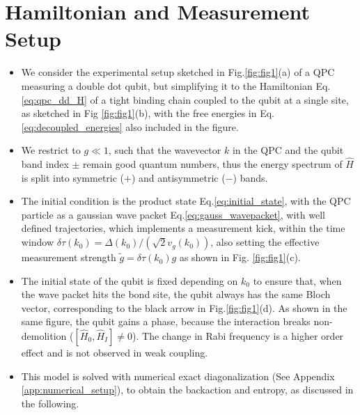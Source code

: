 \documentclass[10pt,
 amsmath,amssymb,
 aps,prb, twocolumn
]{revtex4-2}
\begin{document}
\section{Hamiltonian and Measurement Setup}\label{sect:model}
\begin{itemize}
   \item  We consider the experimental setup sketched in Fig.\ref{fig:fig1}(a) of a QPC measuring a double dot qubit, but simplifying it to the Hamiltonian Eq.\eqref{eq:qpc_dd_H} of a tight binding chain coupled to the qubit at a single site, as sketched in Fig \ref{fig:fig1}(b), with the free energies in Eq.\eqref{eq:decoupled_energies} also included in the figure. 

   \item We restrict to $g\ll 1$, such that the wavevector $k$ in the QPC and the qubit band index $\pm$ remain good quantum numbers, thus the energy spectrum of $\hat{H}$ is split into symmetric ($+$) and antisymmetric ($-$) bands.
   
   \item The initial condition is the product state Eq.\eqref{eq:initial_state}, with the QPC particle as a gaussian wave packet Eq.\eqref{eq:gauss_wavepacket}, with well defined trajectories, which implements a measurement kick, within the time window $\delta \tau(k_0) = \Delta(k_0)/(\sqrt{2}v_g(k_0)) $, also setting the effective measurement strength $\tilde{g} = \delta \tau(k_0) g$ as shown in Fig. \ref{fig:fig1}(c).

    \item The initial state of the  qubit is fixed depending on $k_0$ to ensure that, when the wave packet hits the bond site, the qubit always has the same Bloch vector, corresponding to the black arrow in Fig.\ref{fig:fig1}(d). As shown in the same figure, the qubit gains a phase, because the interaction breaks non-demolition \cite{svensson2013} ($[ \hat{H}_0,\hat{H}_I ]\neq 0$). The change in Rabi frequency is a higher order effect and is not observed in weak coupling.
    
    \item This model is solved with numerical exact diagonalization (See Appendix \ref{app:numerical_setup}), to obtain the backaction and entropy, as discussed in the following.
\end{itemize}
\end{document}
